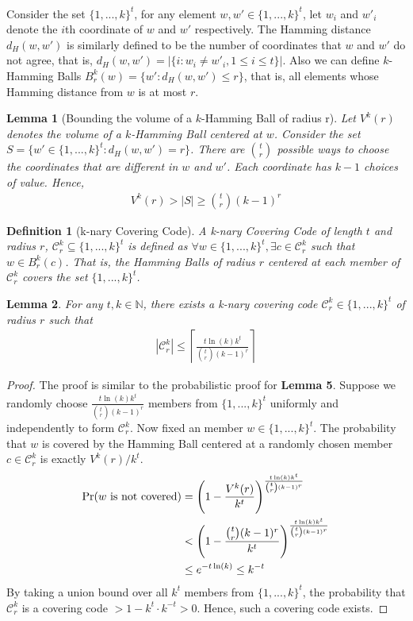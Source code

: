 \documentclass[a4paper,12pts]{article}
\newcommand{\dist}[2]{d_H(#1,#2)}
\newcommand{\ballk}[2]{B^k_{#1}(#2)}
\newcommand{\cc}{\mathcal{C}}
\newcommand{\kbits}{\{1,...,k\}}
\renewcommand{\Pr}{\textnormal{Pr}}
\newtheorem{definition}{Definition}
\newtheorem{lemma}{Lemma}
\begin{document}
\paragraph{}Consider the set $\kbits^t$, for any element $w,w' \in \kbits^t$, let $w_i$ and $w'_i$ denote the $i$th coordinate of $w$ and $w'$ respectively. The Hamming distance $\dist{w}{w'}$ is similarly defined to be the number of coordinates that $w$ and $w'$ do not agree, that is, $\dist{w}{w'} = |\{i:w_i \neq w'_i, 1\leq i \leq t \}|$. Also we can define $k$-Hamming Balls $\ballk{r}{w} = \{w':\dist{w}{w'} \leq r\}$, that is, all elements whose Hamming distance from $w$ is at most $r$. 
\begin{lemma}[Bounding the volume of a $k$-Hamming Ball of radius r\cite{Moser11}]
	Let $V^k(r)$ denotes the volume of a $k$-Hamming Ball centered at $w$. Consider the set $S = \{w' \in \kbits^t: \dist{w}{w'} = r\}$. There are ${t \choose r}$ possible ways to choose the coordinates that are different in $w$ and $w'$. Each coordinate has $k-1$ choices of value. Hence,
	\begin{align*}
	V^k(r) > |S| \geq {t \choose r}(k-1)^r
	\end{align*}
\end{lemma}
\begin{definition}[k-nary Covering Code]
	A k-nary Covering Code of length $t$ and radius $r$, $\cc_r^k \subseteq \kbits^t$ is defined as $\forall w \in \kbits^t, \exists c \in \cc_r^k$ such that $w \in \ballk{r}{c}$. That is, the Hamming Balls of radius $r$ centered at each member of $\cc_r^k$ covers the set $\kbits^t$. 
\end{definition}
\begin{lemma}
	For any $t,k \in \mathbb{N}$, there exists a k-nary covering code $\cc^k_r \in \kbits^t$ of radius $r$ such that 
	\begin{align*}
	|\cc^k_r| \leq \left \lceil \frac{t\ln(k)k^t}{{t \choose r}(k-1)^r} \right \rceil
	\end{align*}
\end{lemma}
\begin{proof}
	The proof is similar to the probabilistic proof for \textbf{Lemma 5}. Suppose we randomly choose $\frac{t\ln(k)k^t}{{t \choose r}(k-1)^r}$ members from $\kbits^t$ uniformly and independently to form $\cc^k_r$. Now fixed an member $w \in \kbits^t$. The probability that $w$ is covered by the Hamming Ball centered at a randomly chosen member $c \in \cc^k_r$ is exactly $V^k(r)/k^t$. 
	\begin{align*}
	\Pr(\text{$w$ is not covered}) &= \Bigg(1-\frac{V^k(r)}{k^t}\Bigg)^{\frac{t\ln(k)k^t}{{t \choose r}(k-1)^r}}\\
	&<\Bigg(1-\frac{{t \choose r}(k-1)^r}{k^t}\Bigg)^{\frac{t\ln(k)k^t}{{t \choose r}(k-1)^r}}\\
	&\leq e^{-t\ln(k)} \leq k^{-t}
	\end{align*}
	By taking a union bound over all $k^t$ members from $\kbits^t$, the probability that $\cc^k_r$ is a covering code $> 1 - k^t\cdot k^{-t} > 0$. Hence, such a covering code exists. 
\end{proof}
\end{document}
